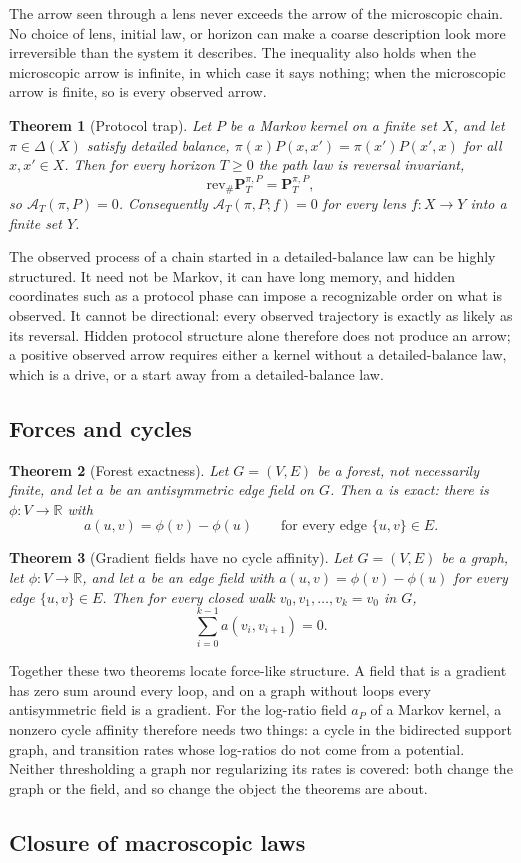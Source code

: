 \documentclass[11pt]{article}
\newtheorem{theorem}{Theorem}[section]
\theoremstyle{definition}
\newcommand{\rev}{\mathrm{rev}}
\newcommand{\1}{\mathbf{1}}
\newcommand{\Arr}{\mathcal{A}}
\newcommand{\ThmStmtNGPROTOCOLTRAP}{Let $P$ be a Markov kernel on a finite set $X$, and let $\pi\in\Delta(X)$ satisfy detailed balance, $\pi(x)P(x,x')=\pi(x')P(x',x)$ for all $x,x'\in X$. Then for every horizon $T\ge 0$ the path law is reversal invariant,
\[
  \rev_{\#}\mathbf{P}^{\pi,P}_T=\mathbf{P}^{\pi,P}_T,
\]
so $\Arr_T(\pi,P)=0$. Consequently $\Arr_T(\pi,P;f)=0$ for every lens $f:X\to Y$ into a finite set $Y$.
}
\newcommand{\ThmStmtNGFORCEFOREST}{Let $G=(V,E)$ be a forest, not necessarily finite, and let $a$ be an antisymmetric edge field on $G$. Then $a$ is exact: there is $\phi:V\to\mathbb{R}$ with
\[
  a(u,v)=\phi(v)-\phi(u)\qquad\text{for every edge }\{u,v\}\in E.
\]
}
\newcommand{\ThmStmtNGFORCENULL}{Let $G=(V,E)$ be a graph, let $\phi:V\to\mathbb{R}$, and let $a$ be an edge field with $a(u,v)=\phi(v)-\phi(u)$ for every edge $\{u,v\}\in E$. Then for every closed walk $v_0,v_1,\dots,v_k=v_0$ in $G$,
\[
  \sum_{i=0}^{k-1}a(v_i,v_{i+1})=0.
\]
}
\begin{document}
The arrow seen through a lens never exceeds the arrow of the microscopic chain.
No choice of lens, initial law, or horizon can make a coarse description look more irreversible than the system it describes.
The inequality also holds when the microscopic arrow is infinite, in which case it says nothing; when the microscopic arrow is finite, so is every observed arrow.

\begin{theorem}[Protocol trap]\label{thm:NG_PROTOCOL_TRAP}
\ThmStmtNGPROTOCOLTRAP
\end{theorem}

The observed process of a chain started in a detailed-balance law can be highly structured.
It need not be Markov, it can have long memory, and hidden coordinates such as a protocol phase can impose a recognizable order on what is observed.
It cannot be directional: every observed trajectory is exactly as likely as its reversal.
Hidden protocol structure alone therefore does not produce an arrow; a positive observed arrow requires either a kernel without a detailed-balance law, which is a drive, or a start away from a detailed-balance law.

\subsection*{Forces and cycles}

\begin{theorem}[Forest exactness]\label{thm:NG_FORCE_FOREST}
\ThmStmtNGFORCEFOREST
\end{theorem}

\begin{theorem}[Gradient fields have no cycle affinity]\label{thm:NG_FORCE_NULL}
\ThmStmtNGFORCENULL
\end{theorem}

Together these two theorems locate force-like structure.
A field that is a gradient has zero sum around every loop, and on a graph without loops every antisymmetric field is a gradient.
For the log-ratio field $a_P$ of a Markov kernel, a nonzero cycle affinity therefore needs two things: a cycle in the bidirected support graph, and transition rates whose log-ratios do not come from a potential.
Neither thresholding a graph nor regularizing its rates is covered: both change the graph or the field, and so change the object the theorems are about.

\subsection*{Closure of macroscopic laws}
\end{document}
